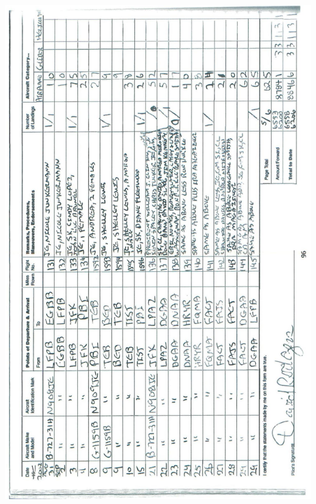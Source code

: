 \documentclass[10pt]{article}
\begin{document}
\includegraphics[max width=\textwidth, center]{2025_02_27_dd68c3d38de88f0516d9g-100}\\
\end{document}
